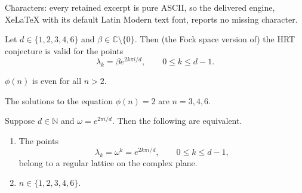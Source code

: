 \documentclass[10pt,a4paper]{amsart}
\newcommand{\C}{\mathbb C}
\newcommand{\N}{\mathbb N}
\begin{document}
Characters: every retained excerpt is pure ASCII, so the delivered engine, XeLaTeX with its default Latin Modern text font, reports no missing character.
\begin{theorem}\label{t1}
Let $d\in\{1,2,3,4,6\}$ and $\beta\in\C\setminus\{0\}$. Then (the Fock 
space version of) the HRT conjecture is valid for the points
$$\lambda_k=\beta e^{2k\pi i/d},\qquad 0\le k\le d-1.$$
\end{theorem}

\begin{lemma}\label{l2}
$\phi(n)$ is even for all $n>2$. 
\end{lemma}

\begin{lemma}\label{l3}
The solutions to the equation $\phi(n)=2$ are $n=3, 4, 6$.
\end{lemma}

\begin{theorem}\label{t4}
Suppose $d\in\N$ and $\omega=e^{2\pi i/d}$. Then the
following are equivalent.
\begin{enumerate}
\item[(a)] The points
$$\lambda_k=\omega^k=e^{2k\pi i/d},\qquad 0\le k\le d-1,$$
belong to a regular lattice on the complex plane.
\item[(b)] $n\in\{1,2,3,4,6\}$.
\end{enumerate}
\end{theorem}
\end{document}
